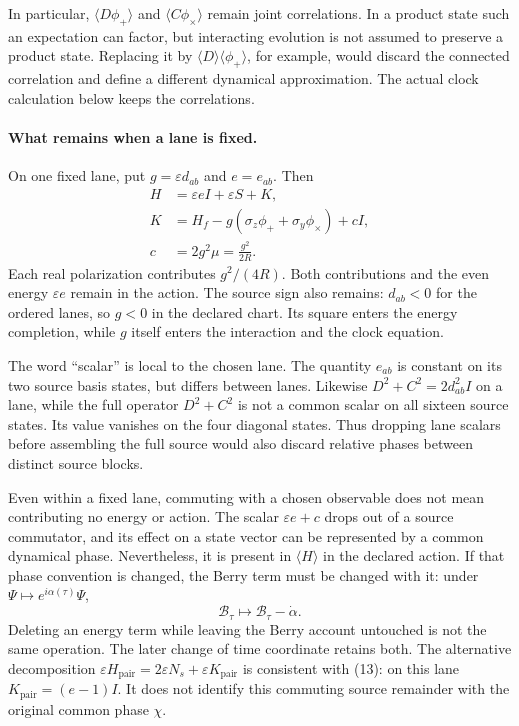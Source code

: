 \documentclass[10pt,twocolumn,letterpaper]{article}
\begin{document}
In particular, $\langle D\phi_+\rangle$ and
$\langle C\phi_\times\rangle$ remain joint correlations.  In a product
state such an expectation can factor, but interacting evolution is not
assumed to preserve a product state.  Replacing it by
$\langle D\rangle\langle\phi_+\rangle$, for example, would discard the
connected correlation and define a different dynamical approximation.
The actual clock calculation below keeps the correlations.

\paragraph{What remains when a lane is fixed.}
On one fixed lane, put $g=\varepsilon d_{ab}$ and $e=e_{ab}$. Then
\begin{equation}
\begin{aligned}
H&=\varepsilon eI+\varepsilon S+K,\\
K&=H_f-g(\sigma_z\phi_++\sigma_y\phi_\times)+cI,\\
c&=2g^2\mu=\frac{g^2}{2R}.
\end{aligned}
\tag{13}
\end{equation}
Each real polarization contributes $g^2/(4R)$. Both contributions and the
even energy $\varepsilon e$ remain in the action.  The source sign also
remains: $d_{ab}<0$ for the ordered lanes, so $g<0$ in the declared chart.
Its square enters the energy completion, while $g$ itself enters the
interaction and the clock equation.

The word ``scalar'' is local to the chosen lane.  The quantity
$e_{ab}$ is constant on its two source basis states, but differs between
lanes.  Likewise $D^2+C^2=2d_{ab}^2I$ on a lane, while the full operator
$D^2+C^2$ is not a common scalar on all sixteen source states.  Its value
vanishes on the four diagonal states.  Thus dropping lane scalars before
assembling the full source would also discard relative phases between
distinct source blocks.

Even within a fixed lane, commuting with a chosen observable does not
mean contributing no energy or action.  The scalar $\varepsilon e+c$
drops out of a source commutator, and its effect on a state vector can be
represented by a common dynamical phase.  Nevertheless, it is present in
$\langle H\rangle$ in the declared action.  If that phase convention is
changed, the Berry term must be changed with it: under
$\Psi\mapsto e^{i\alpha(\tau)}\Psi$,
\[
\mathcal B_\tau\mapsto\mathcal B_\tau-\dot\alpha.
\]
Deleting an energy term while leaving the Berry account untouched is not
the same operation.  The later change of time coordinate retains both.
The alternative decomposition
$\varepsilon H_{\mathrm{pair}}=2\varepsilon N_s+
\varepsilon K_{\mathrm{pair}}$ is consistent with (13): on this lane
$K_{\mathrm{pair}}=(e-1)I$.  It does not identify this commuting source
remainder with the original common phase $\chi$.
\end{document}
